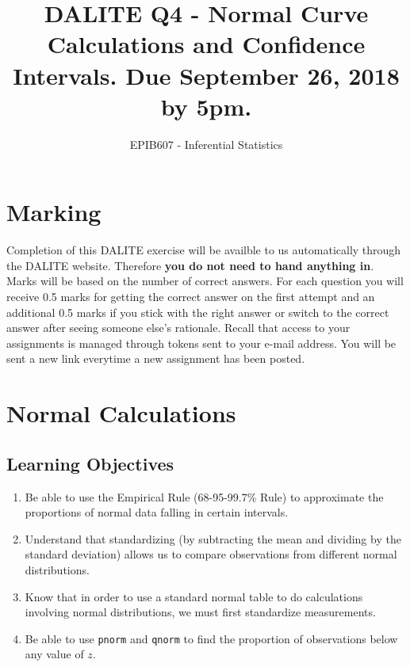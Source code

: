 \documentclass[letterpaper,9pt,twocolumn,twoside,printwatermark=false]{pinp}
\title{DALITE Q4 - Normal Curve Calculations and Confidence Intervals. Due
September 26, 2018 by 5pm.}
\author[a]{EPIB607 - Inferential Statistics}
\affil[a]{Fall 2018, McGill University}
\providecommand{\tightlist}{%
  \setlength{\itemsep}{0pt}\setlength{\parskip}{0pt}}
\begin{document}
\verticaladjustment{-2pt}

\maketitle
\thispagestyle{firststyle}



\section*{Marking}\label{marking}

Completion of this DALITE exercise will be availble to us automatically
through the DALITE website. Therefore \textbf{you do not need to hand
anything in}. Marks will be based on the number of correct answers. For
each question you will receive 0.5 marks for getting the correct answer
on the first attempt and an additional 0.5 marks if you stick with the
right answer or switch to the correct answer after seeing someone else's
rationale. Recall that access to your assignments is managed through
tokens sent to your e-mail address. You will be sent a new link
everytime a new assignment has been posted.

\section{Normal Calculations}\label{normal-calculations}

\subsection{Learning Objectives}\label{learning-objectives}

\begin{enumerate}
\def\labelenumi{\arabic{enumi}.}
\tightlist
\item
  Be able to use the Empirical Rule (68-95-99.7\% Rule) to approximate
  the proportions of normal data falling in certain intervals.
\item
  Understand that standardizing (by subtracting the mean and dividing by
  the standard deviation) allows us to compare observations from
  different normal distributions.
\item
  Know that in order to use a standard normal table to do calculations
  involving normal distributions, we must first standardize
  measurements.
\item
  Be able to use \texttt{pnorm} and \texttt{qnorm} to find the
  proportion of observations below any value of \(z\).
\end{enumerate}
\end{document}
